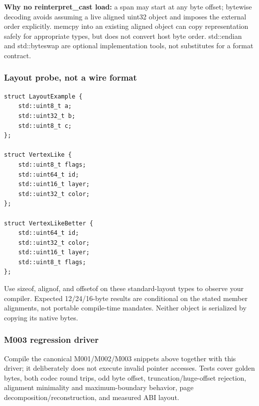 \textbf{Why no reinterpret\_cast load:} a span may start at any byte offset; bytewise decoding avoids assuming a live aligned uint32 object and imposes the external order explicitly. memcpy into an existing aligned object can copy representation safely for appropriate types, but does not convert host byte order. std::endian and std::byteswap are optional implementation tools, not substitutes for a format contract.

\subsubsection{Layout probe, not a wire format}\label{appendix-4e2236f53445-layout-probe-not-a-wire-format}

\hypertarget{appendix-4e2236f53445-layout-probe-not-a-wire-format}{}

\begin{verbatim}
struct LayoutExample {
    std::uint8_t a;
    std::uint32_t b;
    std::uint8_t c;
};

struct VertexLike {
    std::uint8_t flags;
    std::uint64_t id;
    std::uint16_t layer;
    std::uint32_t color;
};

struct VertexLikeBetter {
    std::uint64_t id;
    std::uint32_t color;
    std::uint16_t layer;
    std::uint8_t flags;
};
\end{verbatim}

Use sizeof, alignof, and offsetof on these standard-layout types to observe your compiler. Expected 12/24/16-byte results are conditional on the stated member alignments, not portable compile-time mandates. Neither object is serialized by copying its native bytes.

\subsubsection{M003 regression driver}\label{appendix-4e2236f53445-m003-regression-driver}

\hypertarget{appendix-4e2236f53445-m003-regression-driver}{}

Compile the canonical M001/M002/M003 snippets above together with this driver; it deliberately does not execute invalid pointer accesses. Tests cover golden bytes, both codec round trips, odd byte offset, truncation/huge-offset rejection, alignment minimality and maximum-boundary behavior, page decomposition/reconstruction, and measured ABI layout.

